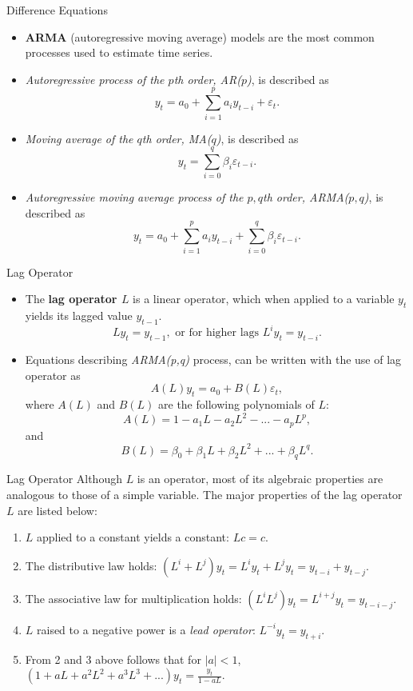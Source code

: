 \documentclass{beamer}
\begin{document}
\begin{frame}{Difference Equations}
\begin{itemize}
    \item \textbf{ARMA} (autoregressive moving average) models are the most common processes used to estimate time series. 
    \item \textit{Autoregressive process of the $p$th order, AR($p$)}, is described as
    \[y_t=a_0+\sum_{i=1}^pa_iy_{t-i}+\varepsilon_t.
    \]
      \item \textit{Moving average of the $q$th order, MA($q$)}, is described as
    \[y_t=\sum_{i=0}^q\beta_i\varepsilon_{t-i}.
    \]
      \item \textit{Autoregressive moving average process of the $p,q$th order, ARMA($p,q$)}, is described as
    \[y_t=a_0+\sum_{i=1}^pa_iy_{t-i}+\sum_{i=0}^q\beta_i\varepsilon_{t-i}.
    \]
\end{itemize}

\end{frame}
\begin{frame}{Lag Operator}
    \begin{itemize}
        \item The \textbf{lag operator $L$} is a linear operator, which when applied to a variable $y_t$ yields its lagged value $y_{t-1}$.  
        \[Ly_t=y_{t-1}, \text{ or for higher lags }L^iy_t=y_{t-i}.
        \]
        \item Equations describing \textit{ARMA(p,q)} process, can be written with the use of lag operator as
        \[A(L)y_t=a_0+B(L)\varepsilon_t,
        \] where $A(L)$ and $B(L)$ are the following polynomials of $L:$
        \[A(L)=1-a_1L-a_2L^2-...-a_pL^p,
        \] and 
        \[B(L)=\beta_0+\beta_1L+\beta_2L^2+...+\beta_qL^q.
        \]
    \end{itemize}
    
    
\end{frame}
\begin{frame}{Lag Operator}
Although $L$ is an operator, most of its algebraic properties are analogous to those of a simple variable. The major properties of the lag operator $L$ are listed below:
\begin{enumerate}
    \item $L$ applied to a constant yields a constant: $Lc=c$.
    \item The distributive law holds: $(L^i+L^j)y_t=L^iy_t+L^jy_t=y_{t-i}+y_{t-j}$.
    \item The associative law for multiplication holds: $(L^iL^j)y_t=L^{i+j}y_t=y_{t-i-j}$.
    \item $L$ raised to a negative power is a \textit{ lead operator}: $L^{-i}y_t=y_{t+i}$. 
    \item From 2 and 3 above follows that for $|a|<1$, $(1+aL+a^2L^2+a^3L^3+...)y_t=\frac{y_t}{1-aL}$.
\end{enumerate}
\end{frame}
\end{document}
